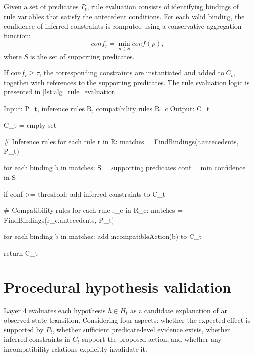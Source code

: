 \documentclass[11pt,titlepage,openright]{book}
\renewenvironment{listing*}[1][]{%
  \begin{listing}[#1]%
    }{%
  \end{listing}}
\begin{document}
Given a set of predicates $P_t$, rule evaluation consists of identifying bindings of rule variables that satisfy the antecedent conditions. For each valid binding, the confidence of inferred constraints is computed using a conservative aggregation function:
\[
conf_r = \min_{p \in S} conf(p),
\]
where $S$ is the set of supporting predicates.

If $conf_r \geq \tau$, the corresponding constraints are instantiated and added to $C_t$, together with references to the supporting predicates. The rule evaluation logic is presented in \cref{lst:alg_rule_evaluation}.



\begin{listing*}
\begin{Code}
Input: P_t, inference rules R, compatibility rules R_c
Output: C_t

C_t = empty set

# Inference rules
for each rule r in R:
    matches = FindBindings(r.antecedents, P_t)

    for each binding b in matches:
        S = supporting predicates
        conf = min confidence in S

        if conf >= threshold:
            add inferred constraints to C_t

# Compatibility rules
for each rule r_c in R_c:
    matches = FindBindings(r_c.antecedents, P_t)

    for each binding b in matches:
        add incompatibleAction(b) to C_t

return C_t
\end{Code}
\caption{Algorithm for implementation of rule evaluation as defined in \cref{sec:layer3-method}.}
\label{lst:alg_rule_evaluation}
\end{listing*}



\section{Procedural hypothesis validation}

Layer 4 evaluates each hypothesis $h \in H_t$ as a candidate explanation of an observed state transition. Considering four aspects: whether the expected effect is supported by $P_t$, whether sufficient predicate-level evidence exists, whether inferred constraints in $C_t$ support the proposed action, and whether any incompatibility relations explicitly invalidate it.
\end{document}

